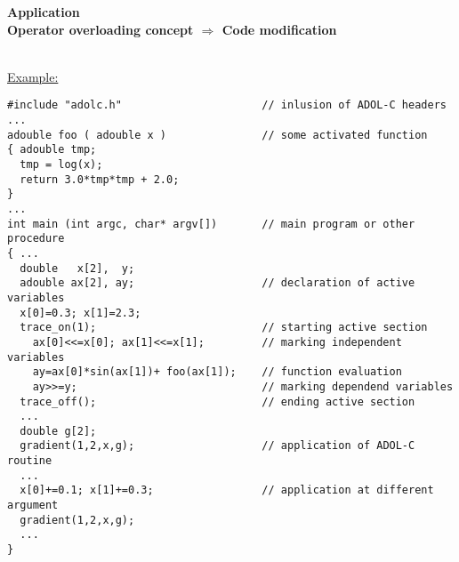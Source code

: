 \documentclass[12pt,oneside,a4paper]{article}
\begin{document}
\newpage
\begin{center}\Large
{\Huge \bf Application}\\[2ex]
{\bf Operator overloading concept $\Rightarrow$ Code modification}\\[2ex]
\\[5ex]
%
\begin{minipage}[h]{160mm}
\small
\underline{Example:}
\begin{verbatim}
#include "adolc.h"                      // inlusion of ADOL-C headers
...
adouble foo ( adouble x )               // some activated function
{ adouble tmp;
  tmp = log(x);
  return 3.0*tmp*tmp + 2.0; 
}
...
int main (int argc, char* argv[])       // main program or other procedure
{ ...
  double   x[2],  y;               
  adouble ax[2], ay;                    // declaration of active variables
  x[0]=0.3; x[1]=2.3;      
  trace_on(1);                          // starting active section
    ax[0]<<=x[0]; ax[1]<<=x[1];         // marking independent variables
    ay=ax[0]*sin(ax[1])+ foo(ax[1]);    // function evaluation
    ay>>=y;                             // marking dependend variables
  trace_off();                          // ending active section
  ...
  double g[2];    
  gradient(1,2,x,g);                    // application of ADOL-C routine
  ...
  x[0]+=0.1; x[1]+=0.3;                 // application at different argument
  gradient(1,2,x,g);
  ...
}
\end{verbatim}
\end{minipage}
\end{center}
\end{document}
